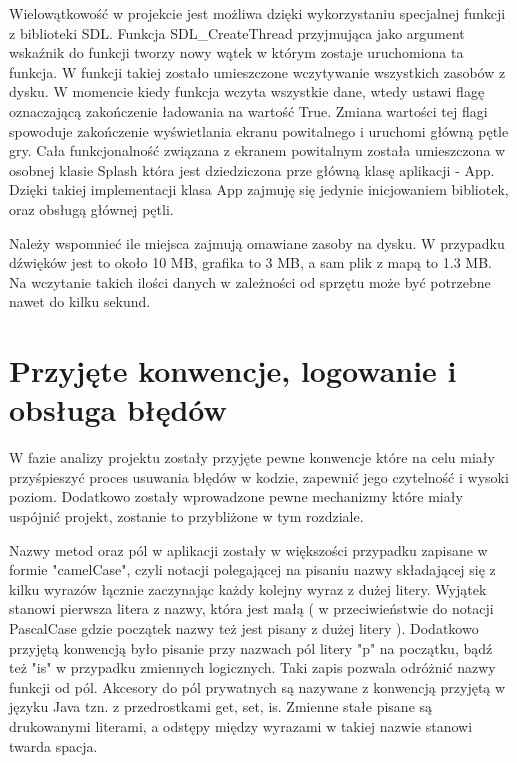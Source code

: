 Wielowątkowość w projekcie jest możliwa dzięki wykorzystaniu specjalnej funkcji z biblioteki SDL. Funkcja SDL\_CreateThread przyjmująca jako argument wskaźnik do funkcji tworzy nowy wątek w którym zostaje uruchomiona ta funkcja. W funkcji takiej zostało umieszczone wczytywanie wszystkich zasobów z dysku. W momencie kiedy funkcja wczyta wszystkie dane, wtedy ustawi flagę oznaczającą zakończenie ładowania na wartość True. Zmiana wartości tej flagi spowoduje zakończenie wyświetlania ekranu powitalnego i uruchomi główną pętle gry. Cała funkcjonalność związana z ekranem powitalnym została umieszczona w osobnej klasie Splash która jest dziedziczona prze główną klasę aplikacji - App. Dzięki takiej implementacji klasa App zajmuję się jedynie inicjowaniem bibliotek, oraz obsługą głównej pętli. 

Należy wspomnieć ile miejsca zajmują omawiane zasoby na dysku. W przypadku  dźwięków jest to około 10 MB, grafika to 3 MB, a sam plik z mapą to 1.3 MB. Na wczytanie takich ilości danych w zależności od sprzętu może być potrzebne nawet do kilku sekund.

\section{Przyjęte konwencje, logowanie i obsługa błędów}
W fazie analizy projektu zostały przyjęte pewne konwencje które na celu miały przyśpieszyć proces usuwania błędów w kodzie, zapewnić jego czytelność i wysoki poziom. Dodatkowo zostały wprowadzone pewne mechanizmy które miały uspójnić projekt, zostanie to przybliżone w tym rozdziale. 


Nazwy metod oraz pól w aplikacji zostały w większości przypadku zapisane w formie "camelCase", czyli notacji polegającej na pisaniu nazwy składającej się z kilku wyrazów łącznie zaczynając każdy kolejny wyraz z dużej litery. Wyjątek stanowi pierwsza litera z nazwy, która jest małą ( w przeciwieństwie do notacji PascalCase gdzie początek nazwy też jest pisany z dużej litery ). Dodatkowo przyjętą konwencją było pisanie przy nazwach pól litery "p" na początku, bądź też "is" w przypadku zmiennych logicznych. Taki zapis pozwala odróżnić nazwy funkcji od pól. Akcesory do pól prywatnych są nazywane z konwencją przyjętą w języku Java tzn. z przedrostkami get, set, is. Zmienne stałe pisane są drukowanymi literami, a odstępy między wyrazami w takiej nazwie stanowi twarda spacja.

